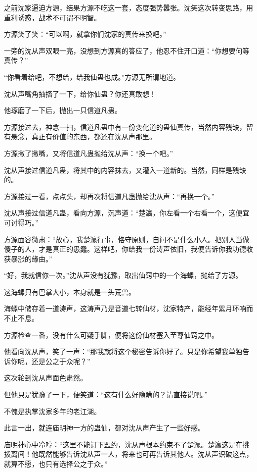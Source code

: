 \begin{this_body}
之前沈家逼迫方源，结果方源不吃这一套，态度强势嚣张。沈笑这次转变思路，用重利诱惑，战术不可谓不明智。

方源笑了笑：“可以啊，就拿你们沈家的真传来换吧。”

一旁的沈从声双眼一亮，没想到方源真的答应了，他忍不住开口道：“你想要何等真传？”

“你看着给吧，不想给，给我仙蛊也成。”方源无所谓地道。

沈从声嘴角抽搐了一下，给你仙蛊？你还真敢想！

他琢磨了一下后，抛出一只信道凡蛊。

方源接过去，神念一扫，信道凡蛊中有一份变化道的蛊仙真传，当然内容残缺，留有悬念，真正有价值的东西，都还在沈从声那里。

方源撇了撇嘴，又将信道凡蛊抛给沈从声：“换一个吧。”

沈从声接过信道凡蛊，将其中的内容抹去，又灌入一道新的。当然，同样是残缺的。

方源接过一看，点点头，却再次将信道凡蛊抛给沈从声：“再换一个。”

沈从声接过信道凡蛊，看向方源，沉声道：“楚瀛，你左看一个右看一个，这便宜可讨得巧。”

方源面容微肃：“放心，我楚瀛行事，恪守原则，自问不是什么小人。把别人当做傻子的人，才是真正的愚蠢。这样吧，你给我一份涛声依旧，我便告诉你我功德收获暴涨的缘由。”

“好，我就信你一次。”沈从声没有犹豫，取出仙窍中的一个海螺，抛给了方源。

这海螺只有巴掌大小，本身就是一头荒兽。

海螺中储存着一道涛声，这涛声乃是音道七转仙材，沈家特产，能经年累月环响而不止不息。

方源检查一番，没有什么可疑手脚，便将这份仙材塞入至尊仙窍之中。

他看向沈从声，笑了一声：“那我就将这个秘密告诉你好了。只是你希望我单独告诉你呢，还是公之于众呢？”

这次轮到沈从声面色肃然。

但他只是犹豫了一下，便笑道：“这有什么好隐瞒的？请直接说吧。”

不愧是执掌沈家多年的老江湖。

此言一出，就连庙明神一方的蛊仙，都对沈从声产生了一些好感。

庙明神心中冷哼：“这里不能订下盟约，沈从声根本约束不了楚瀛。楚瀛这是在挑拨离间！他既然能够告诉沈从声一人，将来也可再告诉其他人。沈从声识破这点，就算不愿，也只有选择公之于众。”


\end{this_body}
